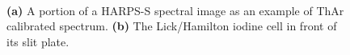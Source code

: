 \begin{figure}
\centering
{}\
\caption{{\bf (a)} A portion of a HARPS-S spectral image as an
  example of ThAr calibrated spectrum. {\bf (b)} The Lick/Hamilton
  iodine cell in front of its slit plate.
\label{intro:fig:thar-iod}}
\end{figure}


